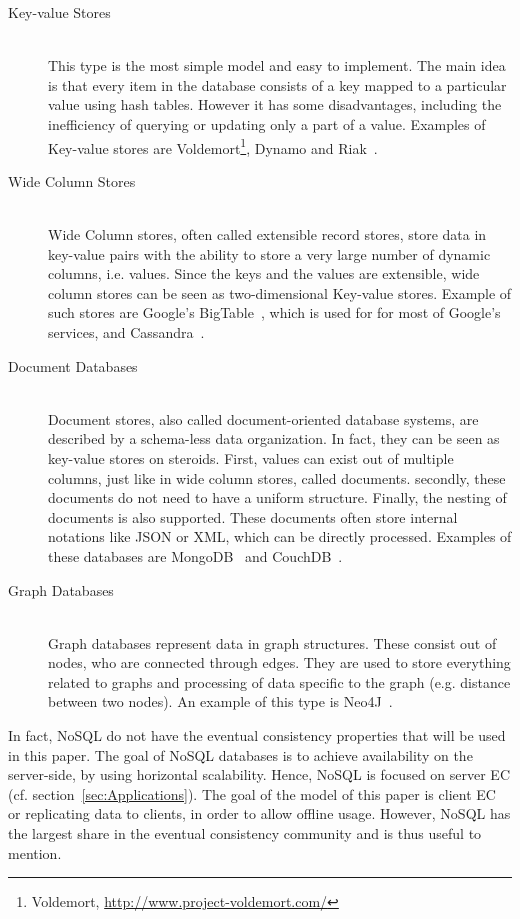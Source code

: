 \documentclass[a4paper,12pt]{report}
\begin{document}
\begin{description}
    \item[Key-value Stores] \hfill \\This type is the most simple model and easy to implement. The main idea is that every item in the database consists of a key mapped to a particular value using hash tables. However it has some disadvantages, including the inefficiency of querying or updating only a part of a value. Examples of Key-value stores are Voldemort\footnote{Voldemort, \url{http://www.project-voldemort.com/}}, Dynamo\cite{Dynamo} and Riak~\cite{Riak}.
    \item[Wide Column Stores] \hfill \\Wide Column stores, often called extensible record stores, store data in key-value pairs with the ability to store a very large number of dynamic columns, i.e. values. Since the keys and the values are extensible, wide column stores can be seen as two-dimensional Key-value stores. Example of such stores are Google's BigTable~\cite{Bigtable}, which is used for for most of Google's services, and Cassandra~\cite{Cassandra}.
    \item[Document Databases] \hfill \\Document stores, also called document-oriented database systems, are described by a schema-less data organization. In fact, they can be seen as key-value stores on steroids. First, values can exist out of multiple columns, just like in wide column stores, called documents. secondly, these documents do not need to have a uniform structure. Finally, the nesting of documents is also supported. These documents often store internal notations like JSON or XML, which can be directly processed. Examples of these databases are MongoDB~\cite{MongoDB} and CouchDB~\cite{CouchDB}.    
    \item[Graph Databases] \hfill \\Graph databases represent data in graph structures. These consist out of nodes, who are connected through edges. They are used to store everything related to graphs and processing of data specific to the graph (e.g. distance between two nodes). An example of this type is Neo4J~\cite{Neo4J}.    
\end{description}

In fact, NoSQL do not have the eventual consistency properties that will be used in this paper. The goal of NoSQL databases is to achieve availability on the server-side, by using horizontal scalability. Hence, NoSQL is focused on server EC (cf. section~\ref{sec:Applications}). The goal of the model of this paper is client EC or replicating data to clients, in order to allow offline usage. However, NoSQL has the largest share in the eventual consistency community and is thus useful to mention. 
\end{document}
